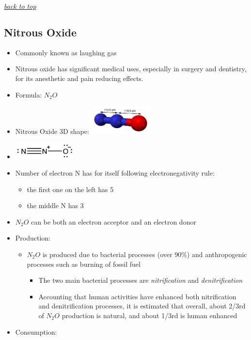 \documentclass[]{book}
\providecommand{\tightlist}{%
  \setlength{\itemsep}{0pt}\setlength{\parskip}{0pt}}
\theoremstyle{definition}
\theoremstyle{definition}
\theoremstyle{definition}
\theoremstyle{remark}
\begin{document}
\emph{\protect\hyperlink{top}{back to top}}

\hypertarget{nitrous-oxide}{\subsection{Nitrous
Oxide}\label{nitrous-oxide}}

\begin{itemize}
\item
  Commonly known as laughing gas
\item
  Nitrous oxide has significant medical uses, especially in surgery and
  dentistry, for its anesthetic and pain reducing effects.
\item
  Formula: \(N_2O\)
\item
  Nitrous Oxide 3D shape:
  \includegraphics[width=0.25000\textwidth]{pictures/Nitrous-oxide-dimensions-3D-balls.png}
\item
  \includegraphics[width=0.25000\textwidth]{pictures/N2O_lewis_structure.png}
\item
  Number of electron N has for itself following electronegativity rule:

  \begin{itemize}
  \tightlist
  \item
    the first one on the left has 5
  \item
    the middle N has 3
  \end{itemize}
\item
  \(N_2O\) can be both an electron acceptor and an electron donor
\item
  Production:

  \begin{itemize}
  \tightlist
  \item
    \(N_2O\) is produced due to bacterial processes (over 90\%) and
    anthropogenic processes such as burning of fossil fuel

    \begin{itemize}
    \tightlist
    \item
      The two main bacterial processes are \emph{nitrification} and
      \emph{denitrification}
    \item
      Accounting that human activities have enhanced both nitrification
      and denitrification processes, it is estimated that overall, about
      2/3rd of \(N_2O\) production is natural, and about 1/3rd is human
      enhanced
    \end{itemize}
  \end{itemize}
\item
  Consumption:


\end{itemize}
\end{document}
